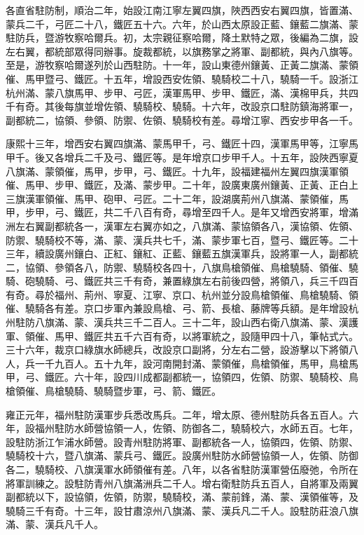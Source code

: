 \begin{pinyinscope}
各直省駐防制，順治二年，始設江南江寧左翼四旗，陜西西安右翼四旗，皆置滿、蒙兵二千，弓匠二十八，鐵匠五十六。六年，於山西太原設正藍、鑲藍二旗滿、蒙駐防兵，暨游牧察哈爾兵。初，太宗親征察哈爾，降土默特之眾，後編為二旗，設左右翼，都統部眾得同辦事。旋裁都統，以旗務掌之將軍、副都統，與內八旗等。至是，游牧察哈爾遂列於山西駐防。十一年，設山東德州鑲黃、正黃二旗滿、蒙領催、馬甲暨弓、鐵匠。十五年，增設西安佐領、驍騎校二十八，驍騎一千。設浙江杭州滿、蒙八旗馬甲、步甲、弓匠，漢軍馬甲、步甲、鐵匠，滿、漢棉甲兵，共四千有奇。其後每旗並增佐領、驍騎校、驍騎。十六年，改設京口駐防鎮海將軍一，副都統二，協領、參領、防禦、佐領、驍騎校有差。尋增江寧、西安步甲各一千。

康熙十三年，增西安右翼四旗滿、蒙馬甲千，弓、鐵匠十四，漢軍馬甲等，江寧馬甲千。後又各增兵二千及弓、鐵匠等。是年增京口步甲千人。十五年，設陜西寧夏八旗滿、蒙領催，馬甲，步甲，弓、鐵匠。十九年，設福建福州左翼四旗漢軍領催、馬甲、步甲、鐵匠，及滿、蒙步甲。二十年，設廣東廣州鑲黃、正黃、正白上三旗漢軍領催、馬甲、砲甲、弓匠。二十二年，設湖廣荊州八旗滿、蒙領催，馬甲，步甲，弓、鐵匠，共二千八百有奇，尋增至四千人。是年又增西安將軍，增滿洲左右翼副都統各一，漢軍左右翼亦如之，八旗滿、蒙協領各八，漢協領、佐領、防禦、驍騎校不等，滿、蒙、漢兵共七千，滿、蒙步軍七百，暨弓、鐵匠等。二十三年，續設廣州鑲白、正紅、鑲紅、正藍、鑲藍五旗漢軍兵，設將軍一人，副都統二，協領、參領各八，防禦、驍騎校各四十，八旗鳥槍領催、鳥槍驍騎、領催、驍騎、砲驍騎、弓、鐵匠共三千有奇，兼置綠旗左右前後四營，將領八，兵三千四百有奇。尋於福州、荊州、寧夏、江寧、京口、杭州並分設鳥槍領催、鳥槍驍騎、領催、驍騎各有差。京口步軍內兼設鳥槍、弓、箭、長槍、藤牌等兵額。是年增設杭州駐防八旗滿、蒙、漢兵共三千二百人。三十二年，設山西右衛八旗滿、蒙、漢護軍、領催、馬甲、鐵匠共五千六百有奇，以將軍統之，設隨甲四十八，筆帖式六。三十六年，裁京口綠旗水師總兵，改設京口副將，分左右二營，設游擊以下將領八人，兵一千九百人。五十九年，設河南開封滿、蒙領催，鳥槍領催，馬甲，鳥槍馬甲，弓、鐵匠。六十年，設四川成都副都統一，協領四，佐領、防禦、驍騎校、鳥槍領催、鳥槍驍騎、驍騎暨步軍，弓、箭、鐵匠。

雍正元年，福州駐防漢軍步兵悉改馬兵。二年，增太原、德州駐防兵各五百人。六年，設福州駐防水師營協領一人，佐領、防御各二，驍騎校六，水師五百。七年，設駐防浙江乍浦水師營。設青州駐防將軍、副都統各一人，協領四，佐領、防禦、驍騎校十六，暨八旗滿、蒙兵弓、鐵匠。設廣州駐防水師營協領一人，佐領、防御各二，驍騎校、八旗漢軍水師領催有差。八年，以各省駐防漢軍營伍廢弛，令所在將軍訓練之。設駐防青州八旗滿洲兵二千人。增右衛駐防兵五百人，自將軍及兩翼副都統以下，設協領，佐領，防禦，驍騎校，滿、蒙前鋒，滿、蒙、漢領催等，及驍騎三千有奇。十三年，設甘肅涼州八旗滿、蒙、漢兵凡二千人。設駐防莊浪八旗滿、蒙、漢兵凡千人。


\end{pinyinscope}

